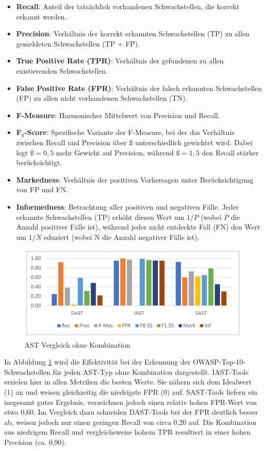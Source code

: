 \documentclass[acmtog]{acmart}
\begin{document}
\begin{itemize}
	\item \textbf{Recall}: Anteil der tatsächlich vorhandenen Schwachstellen, die korrekt erkannt werden.
	\item \textbf{Precision}: Verhältnis der korrekt erkannten Schwachstellen (TP) zu allen gemeldeten Schwachstellen (TP + FP).
	\item \textbf{True Positive Rate (TPR)}: Verhältnis der gefundenen zu allen existierenden Schwachstellen.
	\item \textbf{False Positive Rate (FPR)}: Verhältnis der falsch erkannten Schwachstellen (FP) zu allen nicht vorhandenen Schwachstellen (TN).
	\item \textbf{F-Measure}: Harmonischer Mittelwert von Precision und Recall.
	\item \textbf{F$_{\text{ß}}$-Score}: Spezifische Variante der F-Measure, bei der das Verhältnis zwischen Recall und Precision über ß unterschiedlich gewichtet wird. 
	Dabei legt ${\text{ß} = 0,5}$ mehr Gewicht auf Precision, während ${\text{ß} = 1,5}$ den Recall stärker berücksichtigt.
	\item \textbf{Markedness}: Verhältnis der positiven Vorhersagen unter Berücksichtigung von FP und FN.
	\item \textbf{Informedness}: Betrachtung aller positiven und negativen Fälle. Jeder erkannte Schwachstellen (TP) erhöht diesen Wert um ${1/P}$ (wobei
	${P}$ die Anzahl positiver Fälle ist), während jeder nicht entdeckte Fall (FN) den Wert um ${1/N}$ eduziert (wobei N die Anzahl negativer Fälle ist).
\end{itemize}

\begin{figure}[H]
	\centering
	\includegraphics[width=0.9\linewidth]{images/AST_Comparison.png}
	\caption{AST Vergleich ohne Kombination \cite{mateo_tudela_combining_2020}}
	\label{fig:astCompare}
\end{figure}

In Abbildung \ref{fig:astCompare} wird die Effektivität bei der Erkennung der OWASP-Top-10-Schwachstellen für jeden AST-Typ ohne Kombination dargestellt.
IAST-Tools erzielen hier in allen Metriken die besten Werte.
Sie nähern sich dem Idealwert (1) an und weisen gleichzeitig die niedrigste FPR (0) auf.
SAST-Tools liefern ein insgesamt gutes Ergebnis, verzeichnen jedoch einen relativ hohen FPR-Wert von etwa 0,60.
Im Vergleich dazu schneiden DAST-Tools bei der FPR deutlich besser ab, weisen jedoch nur einen geringen Recall von circa 0,20 auf.
Die Kombination aus niedrigem Recall und vergleichsweise hohem TPR resultiert in einer hohen Precision (ca. 0,90).
\cite{mateo_tudela_combining_2020}
\end{document}
